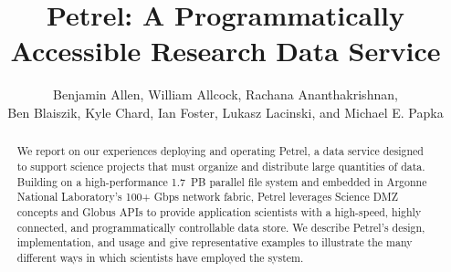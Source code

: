 \documentclass[sigconf]{acmart}
\newcommand\ian[1]{}
\newcommand\ian[1]{{\color{blue}[Ian: #1]}}
\begin{document}
\title{Petrel: A Programmatically Accessible Research Data Service}

\author{Benjamin Allen, William Allcock, Rachana Ananthakrishnan,\\Ben Blaiszik, Kyle Chard, Ian Foster, Lukasz Lacinski, and Michael E. Papka}
\renewcommand{\shortauthors}{B. Allen et al.}


\begin{abstract}
We report on our experiences deploying and operating Petrel,
a data service designed to support science projects 
that must organize and distribute large quantities of data.
Building on a high-performance 1.7~PB parallel file system and
embedded in Argonne National Laboratory's 100+ Gbps network fabric, Petrel 
leverages Science DMZ concepts and Globus APIs 
to provide application scientists with a high-speed,
highly connected, and programmatically controllable data store.
We describe Petrel's design, implementation, and usage and give
representative examples to illustrate the many different ways in which
scientists have employed the system. 
%
%
\ian{The paper is to be submitted to \url{http://www.pdsw.org/index.shtml}. Five pages plus references. Due September 7, 11:59 PM, AOE. Need to fix index terms and keywords.}
\end{abstract}
\end{document}
